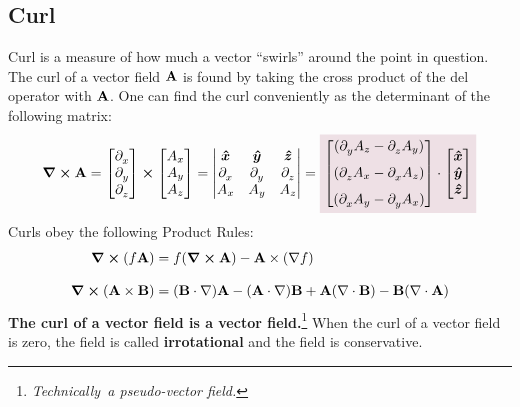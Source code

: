     \subsection*{Curl}
        Curl is a measure of how much a vector ``swirls'' around the point in question. The curl of a vector field \(\vb{A}\) is found by taking the cross product of the del operator with \(\vb{A}\). One can find the curl conveniently as the determinant of the following matrix: 
        \begin{equation}
            \curl \vb{A} = 
            \qty[
                \begin{matrix}
                    \pder*{x}\\\pder*{y}\\\pder*{z}
                \end{matrix}
            ]\cross\qty[
                \begin{matrix}
                    A_x\\A_y\\A_z
                \end{matrix}
            ]=
            \begin{vmatrix}
            \e{x}&\e{y}&\e{z}
            \\
            \pder*{x}&\pder*{y}&\pder*{z}
            \\
            A_x&A_y&A_z
            \end{vmatrix}
            =\coloredanswer{
            \begin{bmatrix}
            (\pder*{y} A_z-\pder*{z} A_y)
            \\[0.25 cm]
            (\pder*{z} A_x-\pder*{x} A_z)
            \\[0.25 cm]
            (\pder*{x} A_y-\pder*{y} A_x)
            \end{bmatrix}
            \cdot
            \begin{bmatrix}
            \e{x}
            \\
            \e{y}
            \\
            \e{z}
            \end{bmatrix}}
        \end{equation}
        Curls obey the following Product Rules:
        \begin{align*}
        \curl (f\vb{A}) &= f(\curl \vb{A}) - \vb{A} \times (\nabla f)
        \\[0.3 cm]
        \curl (\vb{A} \times \vb{B}) &= (\vb{B} \cdot \nabla)\vb{A} - (\vb{A} \cdot \nabla)\vb{B} + \vb{A}(\nabla \cdot \vb{B}) - \vb{B}(\nabla \cdot \vb{A})
        \end{align*}
        \textcolor{Blue1}{\bf The curl of a vector field is a vector field.}\footnote{\sl Technically\rm\ a pseudo-vector field.} When the curl of a vector field is zero, the field is called {\bf irrotational} and the field is conservative. %
